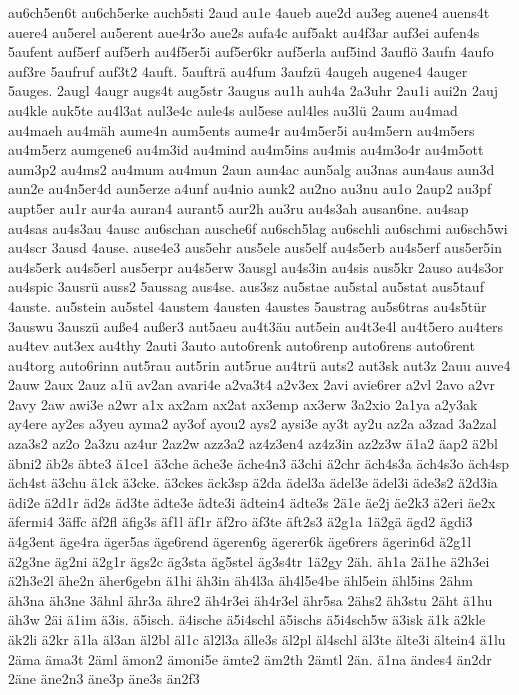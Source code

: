{au6ch5en6t
au6ch5erke
auch5sti
2aud
au1e
4aueb
aue2d
au3eg
auene4
auens4t
auere4
au5erel
au5erent
aue4r3o
aue2s
aufa4c
auf5akt
au4f3ar
auf3ei
aufen4s
5aufent
auf5erf
auf5erh
au4f5er5i
auf5er6kr
auf5erla
auf5ind
3auflö
3aufn
4aufo
auf3re
5aufruf
auf3t2
4auft.
5aufträ
au4fum
3aufzü
4augeh
augene4
4auger
5auges.
2augl
4augr
augs4t
aug5str
3augus
au1h
auh4a
2a3uhr
2au1i
aui2n
2auj
au4kle
auk5te
au4l3at
aul3e4c
aule4s
aul5ese
aul4les
au3lü
2aum
au4mad
au4maeh
au4mäh
aume4n
aum5ents
aume4r
au4m5er5i
au4m5ern
au4m5ers
au4m5erz
aumgene6
au4m3id
au4mind
au4m5ins
au4mis
au4m3o4r
au4m5ott
aum3p2
au4ms2
au4mum
au4mun
2aun
aun4ac
aun5alg
au3nas
aun4aus
aun3d
aun2e
au4n5er4d
aun5erze
a4unf
au4nio
aunk2
au2no
au3nu
au1o
2aup2
au3pf
aupt5er
au1r
aur4a
auran4
aurant5
aur2h
au3ru
au4s3ah
ausan6ne.
au4sap
au4sas
au4s3au
4ausc
au6schan
ausche6f
au6sch5lag
au6schli
au6schmi
au6sch5wi
au4scr
3ausd
4ause.
ause4e3
aus5ehr
aus5ele
aus5elf
au4s5erb
au4s5erf
aus5er5in
au4s5erk
au4s5erl
aus5erpr
au4s5erw
3ausgl
au4s3in
au4sis
aus5kr
2auso
au4s3or
au4spic
3ausrü
auss2
5aussag
aus4se.
aus3sz
au5stae
au5stal
au5stat
aus5tauf
4auste.
au5stein
au5stel
4austem
4austen
4austes
5austrag
au5s6tras
au4s5tür
3auswu
3auszü
auße4
außer3
aut5aeu
au4t3äu
aut5ein
au4t3e4l
au4t5ero
au4ters
au4tev
aut3ex
au4thy
2auti
3auto
auto6renk
auto6renp
auto6rens
auto6rent
au4torg
auto6rinn
aut5rau
aut5rin
aut5rue
au4trü
auts2
aut3sk
aut3z
2auu
auve4
2auw
2aux
2auz
a1ü
av2an
avari4e
a2va3t4
a2v3ex
2avi
avie6rer
a2vl
2avo
a2vr
2avy
2aw
awi3e
a2wr
a1x
ax2am
ax2at
ax3emp
ax3erw
3a2xio
2a1ya
a2y3ak
ay4ere
ay2es
a3yeu
ayma2
ay3of
ayou2
ays2
aysi3e
ay3t
ay2u
az2a
a3zad
3a2zal
aza3s2
az2o
2a3zu
az4ur
2az2w
azz3a2
az4z3en4
az4z3in
az2z3w
ä1a2
äap2
ä2bl
äbni2
äb2s
äbte3
ä1ce1
ä3che
äche3e
äche4n3
ä3chi
ä2chr
äch4s3a
äch4s3o
äch4sp
äch4st
ä3chu
ä1ck
ä3cke.
ä3ckes
äck3sp
ä2da
ädel3a
ädel3e
ädel3i
äde3s2
ä2d3ia
ädi2e
ä2d1r
äd2s
äd3te
ädte3e
ädte3i
ädtein4
ädte3s
2ä1e
äe2j
äe2k3
ä2eri
äe2x
äfermi4
3äffc
äf2fl
äfig3s
äf1l
äf1r
äf2ro
äf3te
äft2s3
ä2g1a
1ä2gä
ägd2
ägdi3
ä4g3ent
äge4ra
äger5as
äge6rend
ägeren6g
ägerer6k
äge6rers
ägerin6d
ä2g1l
ä2g3ne
äg2ni
ä2g1r
ägs2c
äg3sta
äg5stel
äg3s4tr
1ä2gy
2äh.
äh1a
2ä1he
ä2h3ei
ä2h3e2l
ähe2n
äher6gebn
ä1hi
äh3in
äh4l3a
äh4l5e4be
ähl5ein
ähl5ins
2ähm
äh3na
äh3ne
3ähnl
ähr3a
ähre2
äh4r3ei
äh4r3el
ähr5sa
2ähs2
äh3stu
2äht
ä1hu
äh3w
2äi
ä1im
ä3is.
ä5isch.
ä4ische
ä5i4schl
ä5ischs
ä5i4sch5w
ä3isk
ä1k
ä2kle
äk2li
ä2kr
ä1la
äl3an
äl2bl
äl1c
äl2l3a
älle3s
äl2pl
äl4schl
äl3te
älte3i
ältein4
ä1lu
2äma
äma3t
2äml
ämon2
ämoni5e
ämte2
äm2th
2ämtl
2än.
ä1na
ändes4
än2dr
2äne
äne2n3
äne3p
äne3s
än2f3
}
